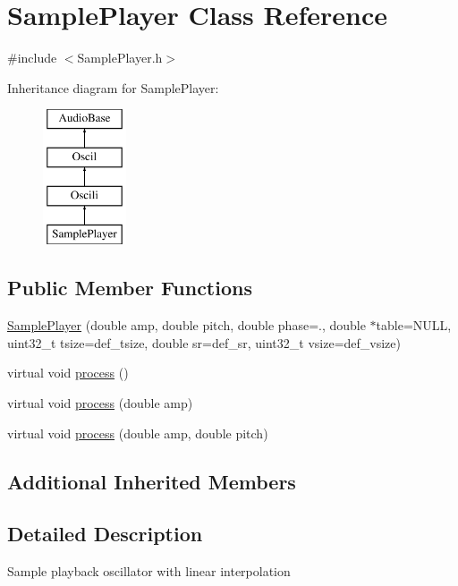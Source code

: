 \hypertarget{class_sample_player}{}\section{Sample\+Player Class Reference}
\label{class_sample_player}


{\ttfamily \#include $<$Sample\+Player.\+h$>$}

Inheritance diagram for Sample\+Player\+:\begin{figure}[H]
\begin{center}
\leavevmode
\includegraphics[height=4.000000cm]{class_sample_player}
\end{center}
\end{figure}
\subsection*{Public Member Functions}
\begin{DoxyCompactItemize}
\item 
\hyperlink{class_sample_player_aa7ce31700ed3ebebfb0604e642ca7ea8}{Sample\+Player} (double amp, double pitch, double phase=., double $\ast$table=N\+U\+LL, uint32\+\_\+t tsize=def\+\_\+tsize, double sr=def\+\_\+sr, uint32\+\_\+t vsize=def\+\_\+vsize)
\item 
virtual void \hyperlink{class_sample_player_a263ee55c5d334486bc57956458a64713}{process} ()
\item 
virtual void \hyperlink{class_sample_player_a806595c5e7674717d52bb8a57f451c0b}{process} (double amp)
\item 
virtual void \hyperlink{class_sample_player_a01fc7c2fdfd29c0c178e288d5aa06acc}{process} (double amp, double pitch)
\end{DoxyCompactItemize}
\subsection*{Additional Inherited Members}


\subsection{Detailed Description}
Sample playback oscillator with linear interpolation 

